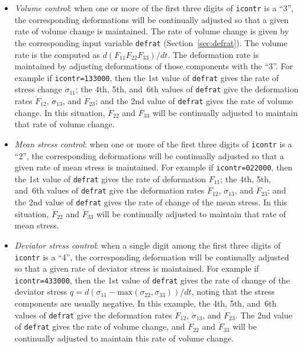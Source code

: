 \documentclass[letterpaper,11pt]{article}
\begin{document}
\begin{itemize}
\item
\emph{Volume control}: when one or more of the first three digits
of \texttt{icontr} is a ``3'', the corresponding deformations will be
continually adjusted so that a given rate of volume change is maintained.
The rate of volume change is given by the corresponding input variable
\texttt{defrat} (Section~\ref{sec:defrat}). 
The volume rate is the computed as $d(F_{11} F_{22} F_{33})/dt$.
The deformation rate is maintained by adjusting deformations of those
components with the ``3''.
For example if \texttt{icontr=133000}, then
the 1st value of \texttt{defrat} gives the rate of stress change
$\dot{\sigma}_{11}$; the 4th, 5th, and~6th values
of \texttt{defrat} give the deformation rates
$\dot{F}_{12}$, $\dot{\sigma}_{13}$, and $\dot{F}_{23}$;
and the 2nd value of \texttt{defrat} gives the rate of volume change.
In this situation, $\dot{F}_{22}$ and $\dot{F}_{33}$
will be continually adjusted to maintain that rate of volume change.
\item
\emph{Mean stress control}:
when one or more of the first three digits
of \texttt{icontr} is a ``2'', the corresponding deformations will be
continually adjusted so that a given rate of mean stress is maintained.
For example if \texttt{icontr=022000}, then
the 1st value of \texttt{defrat} gives the rate of deformation
$\dot{F}_{11}$; the 4th, 5th, and~6th values
of \texttt{defrat} give the deformation rates
$\dot{F}_{12}$, $\dot{\sigma}_{13}$, and $\dot{F}_{23}$;
and the 2nd value of \texttt{defrat} gives the rate of change
of the mean stress.
In this situation, $\dot{F}_{22}$ and $\dot{F}_{33}$
will be continually adjusted to maintain that rate of mean stress.
\item
\emph{Deviator stress control}:
when a single digit among the first three digits
of \texttt{icontr} is a ``4'', the corresponding deformation
will be continually adjusted so that a given rate of deviator stress
is maintained.
For example if \texttt{icontr=433000}, then
the 1st value of \texttt{defrat} gives the rate of change of
the deviator stress 
$q = d(\sigma_{11} - \text{max}(\sigma_{22},\sigma_{33}))/dt$,
noting that the stress components are usually negative.
In this example,
the 4th, 5th, and~6th values
of \texttt{defrat} give the deformation rates
$\dot{F}_{12}$, $\dot{\sigma}_{13}$, and $\dot{F}_{23}$.
The 2nd value of \texttt{defrat} gives the rate of volume change,
and $\dot{F}_{22}$ and $\dot{F}_{33}$
will be continually adjusted to maintain this rate of volume change.
\end{itemize}
%
\end{document}
